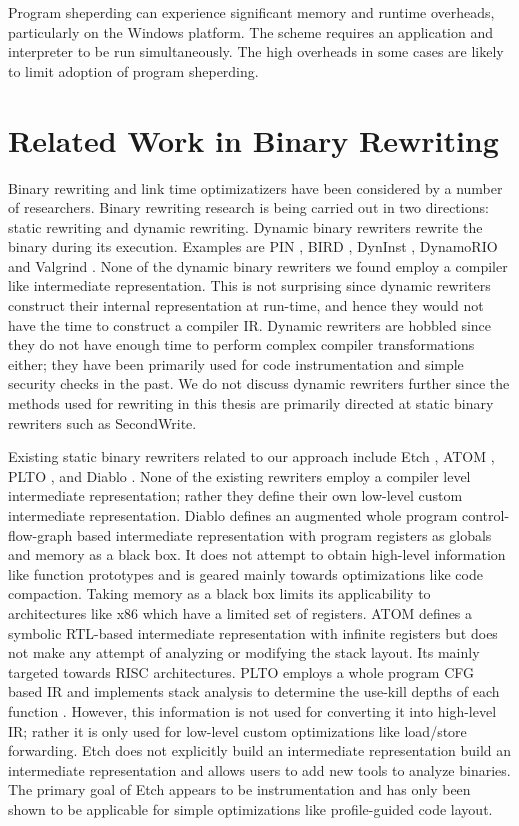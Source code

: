 Program sheperding can experience significant memory and runtime overheads, particularly on the
Windows platform. The scheme requires an application and interpreter to be run simultaneously. The
high overheads in some cases are likely to limit adoption of program sheperding.

\section{Related Work in Binary Rewriting}

Binary rewriting and link time optimizatizers have been considered by a number of researchers.
Binary rewriting research is being carried out in two directions: static rewriting and dynamic
rewriting. Dynamic binary rewriters rewrite the binary during its execution. Examples are PIN
\cite{pin}, BIRD \cite{bird}, DynInst \cite{dyninst}, DynamoRIO \cite{drio} and Valgrind \cite{valg}. None of the dynamic
binary rewriters we found employ a compiler like intermediate representation. This is not surprising
since dynamic rewriters construct their internal representation at run-time, and hence they would
not have the time to construct a compiler IR. Dynamic rewriters are hobbled since they do not have
enough time to perform complex compiler transformations either; they have been primarily used for
code instrumentation and simple security checks in the past. We do not discuss dynamic rewriters
further since the methods used for rewriting in this thesis are primarily directed at static binary
rewriters such as SecondWrite.

Existing static binary rewriters related to our approach include Etch \cite{etch}, ATOM \cite{atom}, PLTO
\cite{plto}, and Diablo \cite{Diablo1}. None of the existing rewriters employ a compiler level intermediate
representation; rather they define their own low-level custom intermediate representation. Diablo
defines an augmented whole program control-flow-graph based intermediate representation with program
registers as globals and memory as a black box. It does not attempt to obtain high-level information
like function prototypes and is geared mainly towards optimizations like code compaction. Taking
memory as a black box limits its applicability to architectures like x86 which have a limited set of
registers. ATOM defines a symbolic RTL-based intermediate representation with infinite registers but
does not make any attempt of analyzing or modifying the stack layout. Its mainly targeted towards
RISC architectures. PLTO employs a whole program CFG based IR and implements stack analysis to
determine the use-kill depths of each function \cite{}. However, this information is not used for
converting it into high-level IR; rather it is only used for low-level custom optimizations like
load/store forwarding. Etch does not explicitly build an intermediate representation build an
intermediate representation and allows users to add new tools to analyze binaries. The primary goal
of Etch appears to be instrumentation and has only been shown to be applicable for simple
optimizations like profile-guided code layout.

